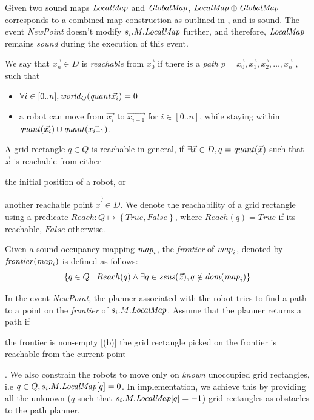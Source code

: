Given two sound maps $\mathit{LocalMap}$ and $\mathit{GlobalMap}$, $\mathit{LocalMap} \oplus \mathit{GlobalMap}$ corresponds to a combined map construction as outlined in , and is sound. The event \emph{NewPoint} doesn't modify $s_i.M.\mathit{LocalMap}$ further, and therefore, $\mathit{LocalMap}$ remains \emph{sound} during the execution of this event.

\begin{definition}
    We say that $\Vec{x_n}\in D$ is \emph{reachable} from $\Vec{x_0}$ if there is a \emph{path} $p = \Vec{x_0},\Vec{x_1}, \Vec{x_2},\ldots, \Vec{x_n}$ , such that
    \begin{itemize}
        \item $\forall i \in [0..n],\mathit{world}_Q(\mathit{quant}{\Vec{x_i}}) = 0$
        \item a robot can move from $\Vec{x_i}$ to $\Vec{x_{i+1}}$ for $i \in [0..n]$, while staying within $\mathit{quant}(\Vec{x_i}) \cup \mathit{quant}(\Vec{x_{i+1}})$.
    \end{itemize}
\end{definition}

A grid rectangle $q\in Q$ is reachable in general, if $\exists \Vec{x}\in D, q = \mathit{quant}(\Vec{x})$ such that $\Vec{x}$ is reachable from either \begin{inparaenum} [(a)]
                                                                                                                                                   \item the initial position of a robot, or \item another reachable point $\Vec{x^\prime}\in D$. We denote the reachability of a grid rectangle using a predicate $\mathit{Reach} : Q \mapsto \left\{\mathit{True}, \mathit{False}\right\}$, where $\mathit{Reach}(q) = \mathit{True}$ if its reachable,  $\mathit{False}$ otherwise.
\end{inparaenum}

\begin{definition}
    Given a sound occupancy mapping $\mathit{map}_i$, the \emph{frontier} of $\mathit{map}_i$, denoted by $\mathit{frontier}(\mathit{map}_i)$ is defined as follows:
    $$ \left\{ q\in Q \mid Reach(q) \wedge \exists q \in \mathit{sens}(\Vec{x}), q \notin \mathit{dom}(\mathit{map}_i)\right\} $$
\end{definition}

In the event \emph{NewPoint}, the planner associated with the robot tries to find a path to a point on the \emph{frontier} of $s_i.M.\mathit{LocalMap}$. Assume that the planner returns a path if \begin{inparaenum}[(a)]
                                                                                                                                                                             \item the frontier is non-empty [(b)] the grid rectangle picked on the frontier is reachable from the current point
\end{inparaenum}. We also constrain the robots to move only on \emph{known} unoccupied grid rectangles, i.e $q\in Q, s_i.M.\mathit{LocalMap}[q] = 0$. In implementation, we achieve this by providing all the unknown ($q$ such that $s_i.M.\mathit{LocalMap}[q] = -1$) grid rectangles as obstacles to the path planner.

